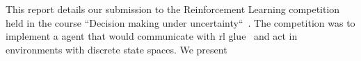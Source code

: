 This report details our submission to the Reinforcement Learning competition held in the course ``Decision making under uncertainty``~\cite{decmaking}. The competition was to implement a agent that would communicate with rl glue~\cite{rl-glue} and act in environments with discrete state spaces.
We present